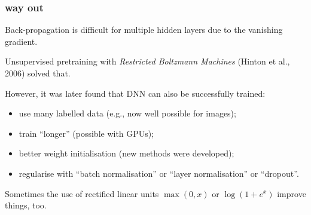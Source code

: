 \documentclass[USenglish,pdftex,compress,10pt,svgnamesi,handout]{beamer}
\begin{document}
\begin{frame}
\frametitle{way out}
Back-propagation is difficult for multiple hidden layers due to the vanishing gradient.

Unsupervised pretraining with \textsl{Restricted Boltzmann Machines} (Hinton et al., 2006) solved that.

However, it was later found that DNN can also be successfully  trained:
\begin{itemize}
  \item use many labelled data (e.g., now well possible for images);
  \item train ``longer'' (possible with GPUs);
  \item better weight initialisation (new methods were developed);
  \item regularise with ``batch normalisation'' or ``layer normalisation'' or ``dropout''.
\end{itemize}

Sometimes the use of rectified linear units $\max(0,x)$ or $\log(1+e^x)$ improve things, too.

\end{frame}
\end{document}
